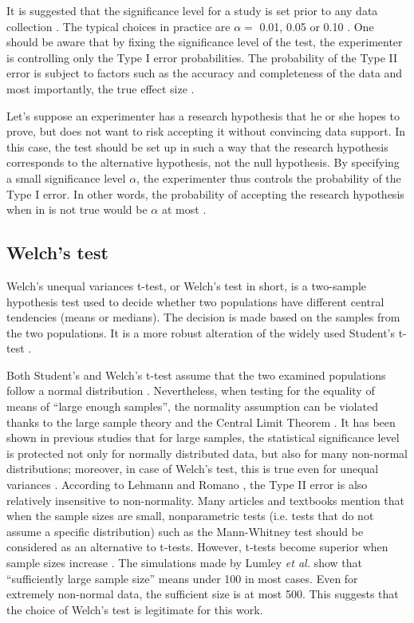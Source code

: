 It is suggested that the significance level for a study is set prior to any data collection \cite{neynman_pearson}. The typical choices in practice are $\alpha =$ 0.01, 0.05 or 0.10 \cite{casella}. One should be aware that by fixing the significance level of the test, the experimenter is controlling only the Type I error probabilities. The probability of the Type II error is subject to factors such as the accuracy and completeness of the data and most importantly, the true effect size \cite{sham_purcell}.

Let's suppose an experimenter has a research hypothesis that he or she hopes to prove, but does not want to risk accepting it without convincing data support. In this case, the test should be set up in such a way that the research hypothesis corresponds to the alternative hypothesis, not the null hypothesis. By specifying a small significance level $\alpha$, the experimenter thus controls the probability of the Type I error. In other words, the probability of accepting the research hypothesis when in is not true would be $\alpha$ at most \cite{casella}.



\subsection{Welch's test}

Welch's unequal variances t-test, or Welch's test in short, is a two-sample hypothesis test used to decide whether two populations have different central tendencies (means or medians). The decision is made based on the samples from the two populations. It is a more robust alteration of the widely used Student's t-test \cite{welch}.

Both Student's and Welch's t-test assume that the two examined populations follow a normal distribution \cite{welch}. Nevertheless, when testing for the equality of means of ``large enough samples'', the normality assumption can be violated thanks to the large sample theory and the Central Limit Theorem \cite{lehmann}. It has been shown in previous studies that for large samples, the statistical significance level is protected not only for normally distributed data, but also for many non-normal distributions; moreover, in case of Welch's test, this is true even for unequal variances \cite{zimmerman_zumbo_1993, zumbo_coulombe_1997, lumley}. According to  Lehmann and Romano \cite{lehmann}, the Type II error is also relatively insensitive to non-normality. Many articles and textbooks mention that when the sample sizes are small, nonparametric tests (i.e. tests that do not assume a specific distribution) such as the Mann-Whitney test \cite{mann} should be considered as an alternative to t-tests.
However, t-tests become superior when sample sizes increase \cite{zimmerman1998, lumley}. The simulations made by Lumley \textit{et al.} \cite{lumley} show that ``sufficiently large sample size'' means under 100 in most cases. Even for extremely non-normal data, the sufficient size is at most 500. This suggests that the choice of Welch's test is legitimate for this work.

